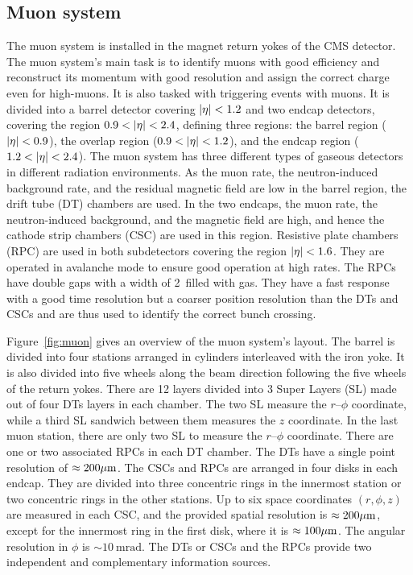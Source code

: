 \subsection{Muon system}

The muon system is installed in the magnet return yokes of the CMS detector. The muon system's main task is to identify muons with good efficiency and reconstruct its momentum with good resolution and assign the correct charge even for high-\pt muons. It is also tasked with triggering events with muons. It is divided into a barrel detector covering $\lvert\eta\rvert < 1.2$ and two endcap detectors, covering the region $0.9 < \lvert\eta\rvert < 2.4$, defining three regions: the barrel region ($\lvert\eta\rvert < 0.9$), the overlap region ($0.9 < \lvert\eta\rvert < 1.2$), and the endcap region ($1.2 < \lvert\eta\rvert < 2.4$). The muon system has three different types of gaseous detectors in different radiation environments. As the muon rate, the neutron-induced background rate, and the residual magnetic field are low in the barrel region, the drift tube (DT) chambers are used. In the two endcaps, the muon rate, the neutron-induced background, and the magnetic field are high, and hence the cathode strip chambers (CSC) are used in this region. Resistive plate chambers (RPC) are used in both subdetectors covering the region $\lvert\eta\rvert < 1.6$. They are operated in avalanche mode to ensure good operation at high rates. The RPCs have double gaps with a width of 2~\mm filled with gas. They have a fast response with a good time resolution but a coarser position resolution than the DTs and CSCs and are thus used to identify the correct bunch crossing.

Figure~\ref{fig:muon} gives an overview of the muon system's layout. The barrel is divided into four stations arranged in cylinders interleaved with the iron yoke. It is also divided into five wheels along the beam direction following the five wheels of the return yokes. There are 12 layers divided into 3 Super Layers (SL) made out of four DTs layers in each chamber. The two SL measure the $r$--$\phi$ coordinate, while a third SL sandwich between them measures the $z$ coordinate. In the last muon station, there are only two SL to measure the $r$--$\phi$ coordinate. There are one or two associated RPCs in each DT chamber. The DTs have a single point resolution of $\approx 200 \mu \text{m}$. The CSCs and RPCs are arranged in four disks in each endcap. They are divided into three concentric rings in the innermost station or two concentric rings in the other stations. Up to six space coordinates $(r, \phi, z)$ are measured in each CSC, and the provided spatial resolution is $\approx 200 \mu \text{m}$, except for the innermost ring in the first disk, where it is $\approx 100 \mu \text{m}$. The angular resolution in $\phi$ is $\sim 10~\text{mrad}$. The DTs or CSCs and the RPCs provide two independent and complementary information sources.

